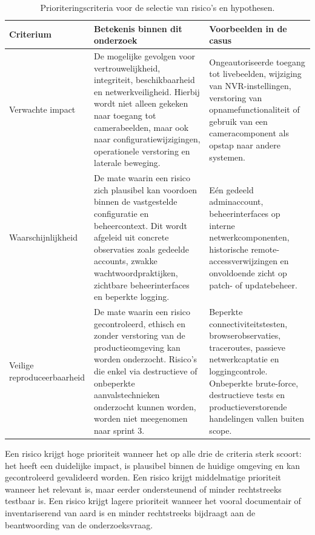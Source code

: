 \begin{table}[H]
    \centering
    \small
    \caption[Prioriteringscriteria voor de risicoanalyse]{Prioriteringscriteria voor de selectie van risico's en hypothesen.}
    \label{tab:prioriteringscriteria}
    {\setlength{\tabcolsep}{4pt}
        \begin{tabular}{p{}p{}p{}}
            \hline
            \textbf{Criterium} & \textbf{Betekenis binnen dit onderzoek} & \textbf{Voorbeelden in de casus} \\
            \hline
            Verwachte impact &
            De mogelijke gevolgen voor vertrouwelijkheid, integriteit, beschikbaarheid en netwerkveiligheid. Hierbij wordt niet alleen gekeken naar toegang tot camerabeelden, maar ook naar configuratiewijzigingen, operationele verstoring en laterale beweging. &
            Ongeautoriseerde toegang tot livebeelden, wijziging van NVR-instellingen, verstoring van opnamefunctionaliteit of gebruik van een cameracomponent als opstap naar andere systemen. \\
            \hline
            Waarschijnlijkheid &
            De mate waarin een risico zich plausibel kan voordoen binnen de vastgestelde configuratie en beheercontext. Dit wordt afgeleid uit concrete observaties zoals gedeelde accounts, zwakke wachtwoordpraktijken, zichtbare beheerinterfaces en beperkte logging. &
            Eén gedeeld adminaccount, beheerinterfaces op interne netwerkcomponenten, historische remote-accessverwijzingen en onvoldoende zicht op patch- of updatebeheer. \\
            \hline
            Veilige reproduceerbaarheid &
            De mate waarin een risico gecontroleerd, ethisch en zonder verstoring van de productieomgeving kan worden onderzocht. Risico's die enkel via destructieve of onbeperkte aanvalstechnieken onderzocht kunnen worden, worden niet meegenomen naar sprint 3. &
            Beperkte connectiviteitstesten, browserobservaties, traceroutes, passieve netwerkcaptatie en loggingcontrole. Onbeperkte brute-force, destructieve tests en productieverstorende handelingen vallen buiten scope. \\
            \hline
        \end{tabular}
    }
\end{table}

Een risico krijgt hoge prioriteit wanneer het op alle drie de criteria sterk scoort: het heeft een duidelijke impact, is plausibel binnen de huidige omgeving en kan gecontroleerd gevalideerd worden. Een risico krijgt middelmatige prioriteit wanneer het relevant is, maar eerder ondersteunend of minder rechtstreeks testbaar is. Een risico krijgt lagere prioriteit wanneer het vooral documentair of inventariserend van aard is en minder rechtstreeks bijdraagt aan de beantwoording van de onderzoeksvraag.

